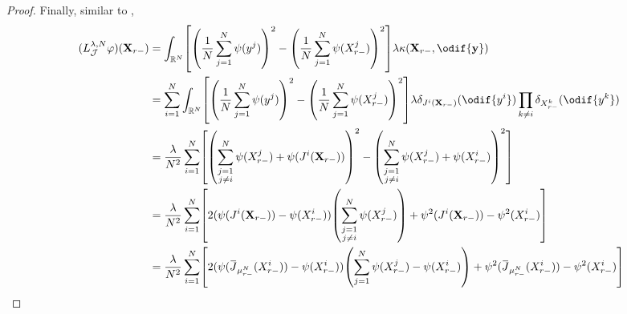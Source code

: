 \begin{proof}
  Finally, similar to ,
  \begin{equation}
    \begin{split}
      (L_{\cJ}^{\lambda, N} \varphi) (\bm{X}_{r-})
       & = \int_{\potspace^N} \sbr*{ \br*{ \frac{1}{N} \sum_{j=1}^N \psi(y^j) }^2 - \br*{ \frac{1}{N} \sum_{j=1}^N \psi(X_{r-}^j) }^2 } \lambda \kappa(\bm{X}_{r-},\odif{\bm{y}})                                                                      \\
       & = \sum_{i=1}^N \int_{\potspace^N} \sbr*{ \br*{ \frac{1}{N} \sum_{j=1}^N \psi(y^j) }^2 - \br*{ \frac{1}{N} \sum_{j=1}^N \psi(X_{r-}^j) }^2 } \lambda \delta_{\jtarg^i(\bm{X}_{r-})}(\odif{y^i}) \prod_{k \neq i} \delta_{X_{r-}^k}(\odif{y^k}) \\
       & = \frac{\lambda}{N^2} \sum_{i=1}^N \sbr*{ \br*{  \sum_{\substack{j=1                                                                                                                                                                          \\ j \neq i}}^N \psi(X_{r-}^j) + \psi(\jtarg^i(\bm{X}_{r-})) }^2 - \br*{ \sum_{\substack{j=1 \\ j \neq i}}^N \psi(X_{r-}^j) + \psi(X_{r-}^i) }^2 }  \\
       & = \frac{\lambda}{N^2} \sum_{i=1}^N \sbr*{ 2 (\psi(\jtarg^i(\bm{X}_{r-})) - \psi(X_{r-}^i)) \br*{\sum_{\substack{j=1                                                                                                                           \\ j \neq i}}^N \psi(X_{r-}^j)} + \psi^2(\jtarg^i(\bm{X}_{r-})) - \psi^2(X_{r-}^i) } \\
       & = \frac{\lambda}{N^2} \sum_{i=1}^N \sbr*{ 2 (\psi(\ol{\jtarg}_{\mu_{r-}^N}(X_{r-}^i)) - \psi(X_{r-}^i)) \br*{\sum_{j=1}^N \psi(X_{r-}^j) - \psi(X_{r-}^i)} + \psi^2(\ol{\jtarg}_{\mu_{r-}^N}(X_{r-}^i)) - \psi^2(X_{r-}^i) }                  \\

\end{split}
\end{equation}
\end{proof}
